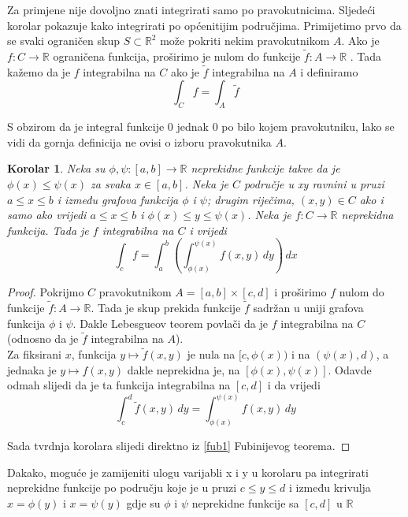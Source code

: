 \documentclass[a4paper, 11pt]{article}
\theoremstyle{plain}
\theoremstyle{plain}
\newtheorem{corolar}[definition]{Korolar}
\theoremstyle{definition}
\theoremstyle{remark}
\begin{document}
Za primjene nije dovoljno znati integrirati samo po pravokutnicima. 
Sljedeći korolar pokazuje kako integrirati po općenitijim područjima. 
Primijetimo prvo da se svaki ograničen skup $S \subset \mathbb{R}^2$ može pokriti nekim pravokutnikom $A$. 
Ako je  $f : C\to \mathbb{R}$ ograničena funkcija, proširimo je nulom do funkcije $\tilde{f} : A\to \mathbb{R}$ .
Tada kažemo da je $f$ integrabilna na $C$ ako je $\tilde{f}$ integrabilna na $A$ i definiramo
$$
    \int_C f= \int_A \tilde{f}
$$

S obzirom da je integral funkcije 0 jednak 0 po bilo kojem pravokutniku, lako se vidi da gornja
definicija ne ovisi o izboru pravokutnika $A$.

    \begin{corolar}
        Neka su $\phi, \psi :[a,b] \to \mathbb{R}$ neprekidne funkcije takve da je $\phi(x) \leq \psi(x)$ za svaka $x \in [a,b]$.
        Neka je $C$ područje u xy ravnini u pruzi $a \leq x \leq b$ i između grafova funkcija $\phi$ i $\psi$;
        drugim riječima, $(x,y) \in C$ ako i samo ako vrijedi $a \leq x \leq b$ i $\phi(x) \leq y \leq \psi(x)$.
        Neka je $f: C \to \mathbb{R}$ neprekidna funkcija. Tada je $f$ integrabilna na $C$ i vrijedi
        $$
            \int_c f=
            \int_a^b \left(\int_{\phi(x)}^{\psi(x)} f(x,y)\, dy\right)\, dx
        $$
    \end{corolar}
    
    \begin{proof}
    Pokrijmo $C$ pravokutnikom $A=[a,b] \times [c,d]$ i proširimo $f$ nulom do funkcije $\tilde{f} : A\to \mathbb{R}$.
    Tada je skup prekida funkcije $\tilde{f}$ sadržan u uniji grafova funkcija $\phi$ i $\psi$.
    Dakle Lebesgueov teorem povlači da je $f$ integrabilna na $C$ (odnosno da je $\tilde{f}$  integrabilna na $A$).\\
    Za fiksirani $x$, funkcija $y \mapsto \tilde{f}(x,y)$ je nula na $[c, \phi(x))$ i na $(\psi(x), d)$, a jednaka je $y \mapsto f(x,y)$
    dakle neprekidna je, na $[\phi(x), \psi(x)]$. Odavde odmah slijedi da je ta funkcija integrabilna na $[c, d]$
    i da vrijedi
        $$
            \int_c^d \tilde{f}(x,y)\, dy=
            \int_{\phi(x)}^{\psi(x)} f(x,y)\, dy
        $$

    Sada tvrdnja korolara slijedi direktno iz \eqref{fub1} Fubinijevog teorema.


\end{proof}


Dakako, moguće je zamijeniti ulogu varijabli x i y u korolaru pa integrirati neprekidne funkcije 
po području koje je u pruzi $c \leq y \leq d$ i između krivulja $x=\phi(y)$ i $x=\psi(y)$ 
gdje su $\phi$ i $\psi$ neprekidne funkcije sa $[c,d]$ u $\mathbb{R}$ 
\end{document}

